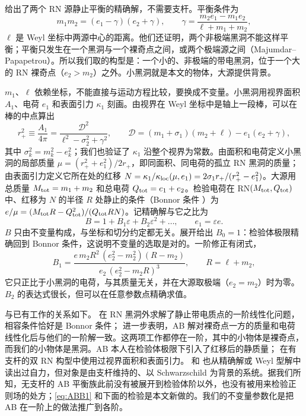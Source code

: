 \documentclass[11pt,a4paper]{ctexart}
\begin{document}
\citet{AlekseevBelinski2007} 给出了两个 RN 源静止平衡的精确解，不需要支杆。平衡条件为
\begin{equation}
m_1m_2=(e_1-\gamma)(e_2+\gamma),\qquad \gamma=\frac{m_2e_1-m_1e_2}{\ell+m_1+m_2},
\label{eq:AB}
\end{equation}
$\ell$ 是 Weyl 坐标中两源中心的距离。他们还证明，两个非极端黑洞不能这样平衡；平衡只发生在一个黑洞与一个裸奇点之间，或两个极端源之间（Majumdar--Papapetrou）。所以我们取的构型是：一个小的、非极端的带电黑洞，位于一个大的 RN 裸奇点（$e_2>m_2$）之外。小黑洞就是本文的物体，大源提供背景。

$m_1$、$\ell$ 依赖坐标，不能直接与运动方程比较，要换成不变量。小黑洞用视界面积 $A_1$、电荷 $e_1$ 和表面引力 $\kappa_1$ 刻画。由视界在 Weyl 坐标中是轴上一段棒，可以在棒的中点算出
\begin{equation*}
r_+^2\equiv\frac{A_1}{4\pi}=\frac{\mathcal D^2}{\ell^2-\sigma_2^2+\gamma^2},\qquad \mathcal D=(m_1+\sigma_1)(m_2+\ell)-e_1(e_2+\gamma),
\end{equation*}
其中 $\sigma_k^2=m_k^2-e_k^2$；我们也验证了 $\kappa_1$ 沿整个视界为常数。由面积和电荷定义小黑洞的局部质量 $\mu=(r_+^2+e_1^2)/2r_+$，即同面积、同电荷的孤立 RN 黑洞的质量；由表面引力定义它所在处的红移 $N=\kappa_1/\kappa_{\rm loc}(\mu,e_1)=2\sigma_1r_+/(r_+^2-e_1^2)$。大源用总质量 $M_{\rm tot}=m_1+m_2$ 和总电荷 $Q_{\rm tot}=e_1+e_2$。检验电荷在 RN$(M_{\rm tot},Q_{\rm tot})$ 中、红移为 $N$ 的半径 $R$ 处静止的条件（Bonnor 条件 \citep{Bonnor1993}）为 $e/\mu=(M_{\rm tot}R-Q_{\rm tot}^2)/(Q_{\rm tot}RN)$。记精确解与它之比为
\begin{equation}
B=1+B_1\varepsilon+B_2\varepsilon^2+\dots,\qquad e_1=\varepsilon e .
\label{eq:Bexp}
\end{equation}
$B$ 只由不变量构成，与坐标和切分约定都无关。展开给出 $B_0=1$：检验体极限精确回到 Bonnor 条件，这说明不变量的选取是对的。一阶修正有闭式，
\begin{equation}
B_1=\frac{e\,m_2R^2\,(e_2^2-m_2^2)(R-m_2)}{e_2\,(e_2^2-m_2R)^3},\qquad R=\ell+m_2 ,
\label{eq:ABB1}
\end{equation}
它只正比于小黑洞的电荷，与其质量无关，并在大源取极端（$e_2=m_2$）时为零。$B_2$ 的表达式很长，但可以在任意参数点精确求值。

与已有工作的关系如下。\citet{BiniGeralicoRuffini2007} 在 RN 黑洞外求解了静止带电质点的一阶线性化问题，相容条件恰好是 Bonnor 条件；\citet{BiniGeralicoRuffini2008} 进一步表明，AB 解对裸奇点一方的质量和电荷线性化后与他们的一阶解一致。这两项工作都停在一阶，其中的小物体是裸奇点，而我们的小物体是黑洞。AB 本人在检验体极限下引入了红移后的静质量；\citet{KrtousZelnikov2020} 在有支杆的双 RN 构型中使用过视界面积和表面引力。\citet{KrtousZelnikov2020} 和 \citet{LaHayePoisson2020} 也从精确解或 Weyl 型解中读出过自力，但对象是由支杆维持的、以 Schwarzschild 为背景的系统。据我们所知，无支杆的 AB 平衡族此前没有被展开到检验体阶以外，也没有被用来检验正则场的处方；\eqref{eq:ABB1} 和下面的检验是本文新做的。我们的不变量参数化是把 AB 在一阶上的做法推广到各阶。
\end{document}
